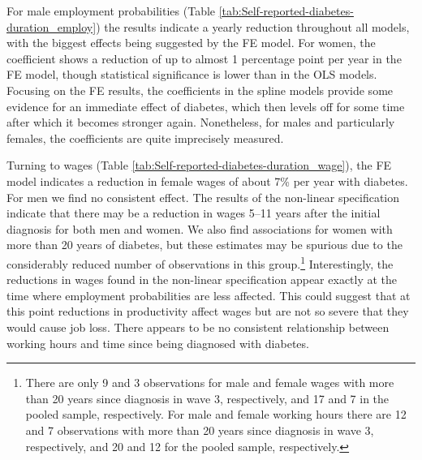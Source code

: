 For male employment probabilities (Table \ref{tab:Self-reported-diabetes-duration_employ}) the results indicate a yearly reduction throughout all models, with the biggest effects being suggested by the \ac{FE} model. For women, the coefficient shows a reduction of up to almost 1 percentage point per year in the \ac{FE} model, though statistical significance is lower than in the \ac{OLS} models. Focusing on the \ac{FE} results, the coefficients in the spline models provide some evidence for an immediate effect of diabetes, which then levels off for some time after which it becomes stronger again. Nonetheless, for males and particularly females, the coefficients are quite imprecisely measured.

Turning to wages (Table \ref{tab:Self-reported-diabetes-duration_wage}), the \ac{FE} model indicates a reduction in female wages of about 7\% per year with diabetes. For men we find no consistent effect. The results of the non-linear specification indicate that there may be a reduction in wages 5--11 years after the initial diagnosis for both men and women. We also find associations for women with more than 20 years of diabetes, but these estimates may be spurious due to the considerably reduced number of observations in this group.\footnote{There are only 9 and 3 observations for male and female wages with more than 20 years since diagnosis in wave 3, respectively, and 17 and 7 in the pooled sample, respectively. For male and female working hours there are 12 and 7 observations with more than 20 years since diagnosis in wave 3, respectively, and 20 and 12 for the pooled sample, respectively.} Interestingly, the reductions in wages found in the non-linear specification appear exactly at the time where employment probabilities are less affected. This could suggest that at this point reductions in productivity affect wages but are not so severe that they would cause job loss. There appears to be no consistent relationship between working hours and time since being diagnosed with diabetes.
   

